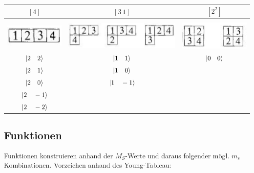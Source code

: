 \documentclass[12pt,a4paper]{article}
\begin{document}
\begin{table}[H]
\centering
\begin{tabular}{|c|c|c|}
\hline
 $\left[ 4\right]$ & $\left[ 3\,1\right]$ & $\left[ 2^2\right]$ \\
\hline & & \\
 \includegraphics[scale=0.2]{build/young-4.png} & \includegraphics[scale=0.2]{build/young-31.png} & \includegraphics[scale=0.2]{build/young-2hoch2.png} \\
\hline
$\ket{ 2 \quad 2}$ &$\ket{ 1 \quad 1}$&$\ket{ 0\quad 0}$ \\
$\ket{ 2 \quad 1}$ &$\ket{ 1 \quad 0}$& \\
$\ket{ 2 \quad 0}$ &$\ket{ 1 \quad -1}$  & \\
$\ket{ 2 \quad -1}$ & & \\
$\ket{ 2 \quad -2}$ & & \\
\hline
\end{tabular}
\end{table}

\subsection{Funktionen}
Funktionen konstruieren anhand der $M_S$-Werte und daraus folgender mögl. $m_s$ Kombinationen. Vorzeichen anhand des Young-Tableau: \\
\end{document}
